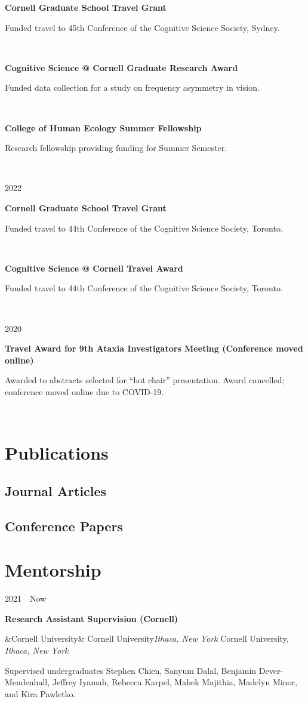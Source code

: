 \documentclass{article}
\newcommand{\entry}[5]{

  \begin{minipage}[t]{.15\textwidth}
    \begin{flushright}
      \hfill {#1}
    \end{flushright}
  \end{minipage}
  \hfill\vline\hfill
  \begin{minipage}[t]{.80\textwidth}
    \textbf{#2}

    \ifx&#3&
      {#3}\textit{#4}
    \else
      {#3, }\textit{#4}

    \fi
    \footnotesize{#5}
  \end{minipage}\\\vspace{.25cm}
}
\newcommand{\awardentry}[3]{
  \begin{minipage}[t]{.15\textwidth}
    \begin{flushright}
      \hfill {#1}
    \end{flushright}
  \end{minipage}
  \hfill\vline\hfill
  \begin{minipage}[t]{.80\textwidth}
    \textbf{#2}

    \footnotesize{#3}
  \end{minipage}\\\vspace{.25cm}
}
\newcommand{\cu}{Cornell University}
\begin{document}
\awardentry{}{Cornell Graduate School Travel Grant}
{Funded travel to 45th Conference of the Cognitive Science Society, Sydney.}

\awardentry{}{Cognitive Science @ Cornell Graduate Research Award}
{Funded data collection for a study on frequency asymmetry in vision.}

\awardentry{}{College of Human Ecology Summer Fellowship}
{Research fellowship providing funding for Summer Semester.}

\awardentry{2022}{Cornell Graduate School Travel Grant}
{Funded travel to 44th Conference of the Cognitive Science Society, Toronto.}

\awardentry{}{Cognitive Science @ Cornell Travel Award}
{Funded travel to 44th Conference of the Cognitive Science Society, Toronto.}

\awardentry{2020}{Travel Award for 9th Ataxia Investigators Meeting (Conference moved online)}
{Awarded to abstracts selected for “hot chair” presentation. Award cancelled; conference moved online due to COVID-19.}


\section{Publications}

\subsection{Journal Articles}
\nocite{*}
\printbibliography[heading=none]

\subsection{Conference Papers}
\nocite{*}
\printbibliography[heading=none]



\section{Mentorship}

\entry{2021~\textendash~Now}{Research Assistant Supervision (Cornell)}
{\cu}{Ithaca, New York}
{Supervised undergraduates Stephen Chien, Sanyum Dalal, Benjamin Dever-Mendenhall, Jeffrey Iyamah, Rebecca Karpel, Mahek Majithia, Madelyn Minor, and Kira Pawletko.}
\end{document}
